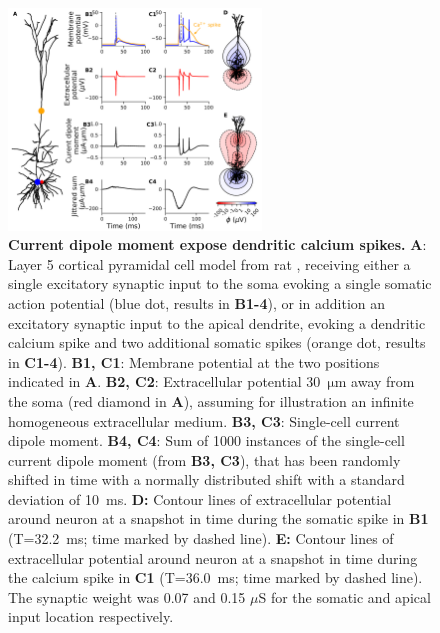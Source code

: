 \documentclass[preprint,10pt,authoryear]{elsarticle}
\newcommand{\tvntxt}[1]{{\color{Emerald}#1}}
\begin{document}
\begin{figure}[H]
	\centering
	\includegraphics[width=0.6\textwidth]{ca_spike_hay}
	\caption{\textbf{Current dipole moment expose dendritic calcium spikes.}
		\textbf{A}: Layer 5 cortical pyramidal cell model from rat \citep{HAY2011}, receiving either a single excitatory synaptic input to the soma evoking a single somatic action potential (blue dot, results in \textbf{B1-4}), or in addition an excitatory synaptic input to the apical dendrite, evoking a dendritic calcium spike and two additional somatic spikes (orange dot, results in \textbf{C1-4}). 
		\textbf{B1, C1}: Membrane potential at the two positions indicated in \textbf{A}.
		\textbf{B2, C2}: Extracellular potential 30~$\si{\um}$ away from the soma (red diamond in \textbf{A}), assuming for illustration an infinite homogeneous extracellular medium. 
		\textbf{B3, C3}: Single-cell current dipole moment. 
		\textbf{B4, C4}: Sum of 1000 instances of the single-cell current dipole moment (from \textbf{B3, C3}), that has been randomly shifted in time with a normally distributed shift with a standard deviation of 10~ms. 
\tvntxt{\textbf{D:} Contour lines of extracellular potential around neuron at a snapshot in time during the somatic spike in \textbf{B1} (T=32.2~ms; time marked by dashed line).
\textbf{E:} Contour lines of extracellular potential around neuron at a snapshot in time during the calcium spike in \textbf{C1} (T=36.0~ms; time marked by dashed line).
The synaptic weight was 0.07 and 0.15 $\mu$S for the somatic and apical input location respectively.
}
	}
	\label{fig:ca_spike}
\end{figure}
\end{document}
